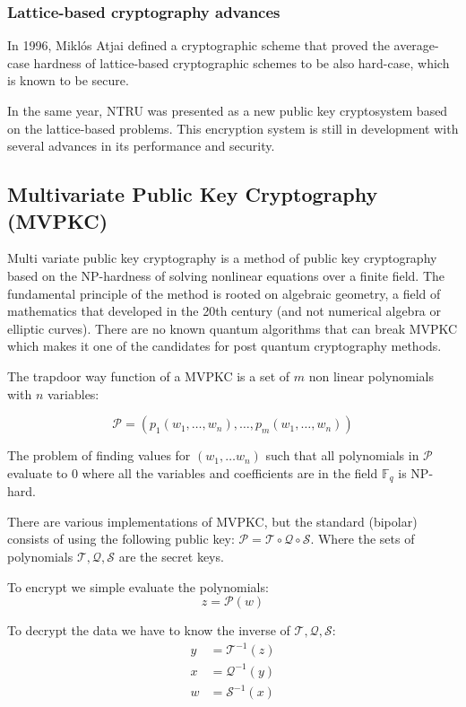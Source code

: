 \subsubsection{Lattice-based cryptography advances}

In 1996, Miklós Atjai defined a cryptographic scheme that proved the
average-case hardness of lattice-based cryptographic schemes to be also
hard-case, which is known to be secure.

In the same year, NTRU was presented as a new public key cryptosystem based on
the lattice-based problems. This encryption system is still in development with
several advances in its performance and security.



\pagebreak
\subsection{Multivariate Public Key Cryptography (MVPKC)}

Multi variate public key cryptography is a method of public key cryptography
based on the NP-hardness of solving nonlinear equations over a finite field.
The fundamental principle of the method is rooted on algebraic geometry, a field
of mathematics that developed in the 20th century (and not numerical algebra or
elliptic curves). There are no known quantum algorithms that can break MVPKC
which makes it one of the candidates for post quantum cryptography methods.
\cite{ding_multivariate_2009}

The trapdoor way function of a MVPKC is a set of $m$ non linear polynomials with
$n$ variables:

$$ \mathcal{P} = (p_1(w_1, \dots, w_n), \dots, p_m(w_1, \dots, w_n))$$

The problem of finding values for $(w_1, \dots w_n)$ such that all polynomials
in $\mathcal{P}$ evaluate to 0 where all the variables and coefficients are in
the field $\mathds{F}_q$ is NP-hard.

There are various implementations of MVPKC, but the standard (bipolar) consists of using
the following public key: $\mathcal{P} = \mathcal{T} \circ \mathcal{Q} \circ \mathcal{S}$.
Where the sets of polynomials $\mathcal{T}, \mathcal{Q}, \mathcal{S}$ are the secret keys.

To encrypt we simple evaluate the polynomials:
\begin{equation}
    z = \mathcal{P}(w)
\end{equation}

To decrypt the data we have to know the inverse of $\mathcal{T}, \mathcal{Q}, \mathcal{S}$:
\begin{align*}
    y &= \mathcal{T}^{−1}(z) \\
    x &= \mathcal{Q}^{−1}(y) \\
    w &= \mathcal{S}^{−1}(x)
\end{align*}

